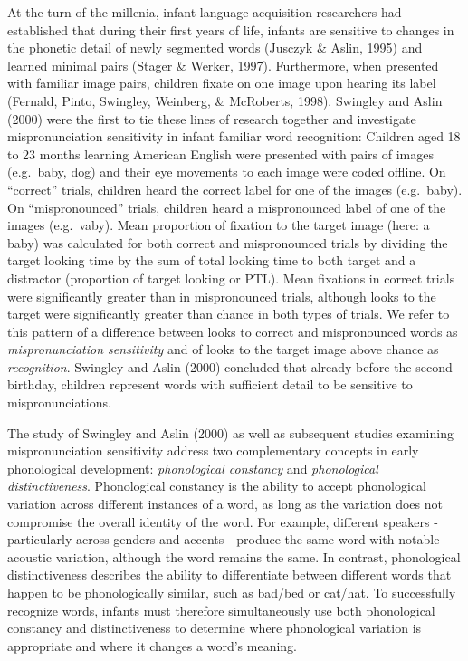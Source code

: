 \documentclass[man]{apa6}
\theoremstyle{definition}
\theoremstyle{definition}
\theoremstyle{definition}
\theoremstyle{remark}
\begin{document}
At the turn of the millenia, infant language acquisition researchers had
established that during their first years of life, infants are sensitive
to changes in the phonetic detail of newly segmented words (Jusczyk \&
Aslin, 1995) and learned minimal pairs (Stager \& Werker, 1997).
Furthermore, when presented with familiar image pairs, children fixate
on one image upon hearing its label (Fernald, Pinto, Swingley, Weinberg,
\& McRoberts, 1998). Swingley and Aslin (2000) were the first to tie
these lines of research together and investigate mispronunciation
sensitivity in infant familiar word recognition: Children aged 18 to 23
months learning American English were presented with pairs of images
(e.g.~baby, dog) and their eye movements to each image were coded
offline. On \enquote{correct} trials, children heard the correct label
for one of the images (e.g.~baby). On \enquote{mispronounced} trials,
children heard a mispronounced label of one of the images (e.g.~vaby).
Mean proportion of fixation to the target image (here: a baby) was
calculated for both correct and mispronounced trials by dividing the
target looking time by the sum of total looking time to both target and
a distractor (proportion of target looking or PTL). Mean fixations in
correct trials were significantly greater than in mispronounced trials,
although looks to the target were significantly greater than chance in
both types of trials. We refer to this pattern of a difference between
looks to correct and mispronounced words as \emph{mispronunciation
sensitivity} and of looks to the target image above chance as
\emph{recognition}. Swingley and Aslin (2000) concluded that already
before the second birthday, children represent words with sufficient
detail to be sensitive to mispronunciations.

The study of Swingley and Aslin (2000) as well as subsequent studies
examining mispronunciation sensitivity address two complementary
concepts in early phonological development: \emph{phonological
constancy} and \emph{phonological distinctiveness}. Phonological
constancy is the ability to accept phonological variation across
different instances of a word, as long as the variation does not
compromise the overall identity of the word. For example, different
speakers - particularly across genders and accents - produce the same
word with notable acoustic variation, although the word remains the
same. In contrast, phonological distinctiveness describes the ability to
differentiate between different words that happen to be phonologically
similar, such as bad/bed or cat/hat. To successfully recognize words,
infants must therefore simultaneously use both phonological constancy
and distinctiveness to determine where phonological variation is
appropriate and where it changes a word's meaning.
\end{document}
